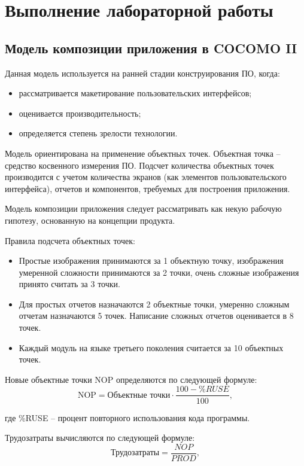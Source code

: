 \chapter{Выполнение лабораторной работы}

\section{Модель композиции приложения в COCOMO II}

Данная модель используется на ранней стадии конструирования ПО, когда:
\begin{itemize}
    \item рассматривается макетирование пользовательских интерфейсов;
    \item оценивается производительность;
    \item определяется степень зрелости технологии.
\end{itemize}

Модель ориентирована на применение объектных точек. Объектная точка --
средство косвенного измерения ПО. Подсчет количества объектных точек
производится с учетом количества экранов (как элементов пользовательского
интерфейса), отчетов и компонентов, требуемых для построения приложения.

Модель композиции приложения следует рассматривать как некую рабочую
гипотезу, основанную на концепции продукта.

Правила подсчета объектных точек:
\begin{itemize}
    \item Простые изображения принимаются за 1 объектную точку, изображения умеренной сложности принимаются за 2 точки, очень сложные изображения принято считать за 3 точки.
    \item Для простых отчетов назначаются 2 объектные точки, умеренно сложным отчетам
    назначаются 5 точек. Написание сложных отчетов оценивается в 8 точек.
    \item Каждый модуль на языке третьего поколения считается за 10 объектных точек.
\end{itemize}

Новые объектные точки NOP определяются по следующей формуле:
\begin{equation}
    \text{NOP} = \text{Объектные точки} \cdot  \frac{100 - \%RUSE}{100},
\end{equation}

где \%RUSE -- процент повторного использования кода программы.

Трудозатраты вычисляются по следующей формуле:
\begin{equation}
    \text{Трудозатраты} = \frac{NOP}{PROD},
\end{equation}

